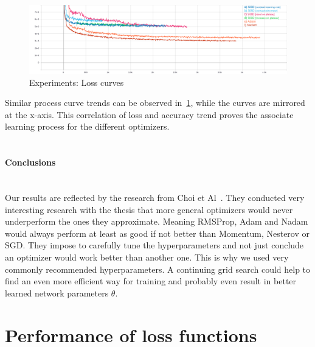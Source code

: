 \begin{figure}[H]
    \centering
    \includegraphics[width=\textwidth,height=\textheight,keepaspectratio]{img/loss_all.png}
    \decoRule
    \caption[Experiments: Loss curves]{Experiments: Loss curves}
    \label{fig:loss}
\end{figure}
Similar process curve trends can be observed in~\ref{fig:loss}, while the curves are mirrored at the x-axis.
This correlation of loss and accuracy trend proves the associate learning process for the different optimizers.
\\\mbox{}\\
\paragraph{Conclusions}\mbox{}\\
Our results are reflected by the research from Choi et Al~\cite{empiricaloptimizers}.
They conducted very interesting research with the thesis that more general optimizers would never underperform
the ones they approximate.
Meaning RMSProp, Adam and Nadam would always perform at least as good if not better than Momentum, Nesterov or SGD.
They impose to carefully tune the hyperparameters and not just conclude an optimizer would work better than another one.
This is why we used very commonly recommended hyperparameters.
A continuing grid search could help to find an even more efficient way for training and probably even result in better
learned network parameters $\theta$.





\section{Performance of loss functions}

